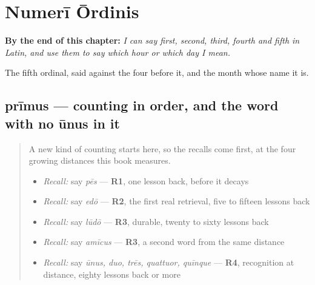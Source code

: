 
\chapter{Numerī Ōrdinis}
\label{ch:la-ordinals}

\begin{chapteropening}
\textbf{By the end of this chapter:} \emph{I can say first, second, third, fourth and fifth in Latin, and use them to say which hour or which day I mean.}

The fifth ordinal, said against the four before it, and the month whose name it is.
\end{chapteropening}

\section[prīmus, prīma, prīmum]{prīmus — counting in order, and the word with no ūnus in it}

\label{lesson:LA-C55-primus}



\begin{quote}
A new kind of counting starts here, so the recalls come first, at the four growing distances this book measures.

\begin{itemize}
\raggedright
  \item \emph{Recall:} say \emph{pēs} — \textbf{R1}, one lesson back, before it decays
  \item \emph{Recall:} say \emph{edō} — \textbf{R2}, the first real retrieval, five to fifteen lessons back
  \item \emph{Recall:} say \emph{lūdō} — \textbf{R3}, durable, twenty to sixty lessons back
  \item \emph{Recall:} say \emph{amīcus} — \textbf{R3}, a second word from the same distance
  \item \emph{Recall:} say \emph{ūnus, duo, trēs, quattuor, quīnque} — \textbf{R4}, recognition at distance, eighty lessons back or more
\end{itemize}
\end{quote}

